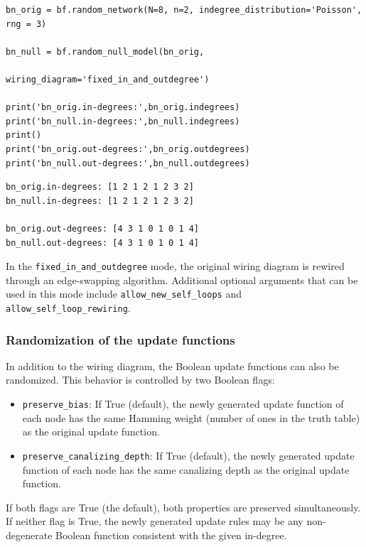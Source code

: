 \documentclass[
]{article}
\begin{document}
\begin{lstlisting}
bn_orig = bf.random_network(N=8, n=2, indegree_distribution='Poisson', rng = 3)

bn_null = bf.random_null_model(bn_orig, 
                               wiring_diagram='fixed_in_and_outdegree')

print('bn_orig.in-degrees:',bn_orig.indegrees)
print('bn_null.in-degrees:',bn_null.indegrees)
print()
print('bn_orig.out-degrees:',bn_orig.outdegrees)
print('bn_null.out-degrees:',bn_null.outdegrees)
\end{lstlisting}

\begin{lstlisting}
bn_orig.in-degrees: [1 2 1 2 1 2 3 2]
bn_null.in-degrees: [1 2 1 2 1 2 3 2]

bn_orig.out-degrees: [4 3 1 0 1 0 1 4]
bn_null.out-degrees: [4 3 1 0 1 0 1 4]
\end{lstlisting}

In the \texttt{fixed\_in\_and\_outdegree} mode, the original wiring
diagram is rewired through an edge-swapping algorithm. Additional
optional arguments that can be used in this mode include
\texttt{allow\_new\_self\_loops} and
\texttt{allow\_self\_loop\_rewiring}.

\subsubsection{Randomization of the update
functions}\label{randomization-of-the-update-functions}

In addition to the wiring diagram, the Boolean update functions can also
be randomized. This behavior is controlled by two Boolean flags:

\begin{itemize}
\item
  \texttt{preserve\_bias}: If True (default), the newly generated update
  function of each node has the same Hamming weight (number of ones in
  the truth table) as the original update function.
\item
  \texttt{preserve\_canalizing\_depth}: If True (default), the newly
  generated update function of each node has the same canalizing depth
  as the original update function.
\end{itemize}

If both flags are True (the default), both properties are preserved
simultaneously. If neither flag is True, the newly generated update
rules may be any non-degenerate Boolean function consistent with the
given in-degree.
\end{document}
